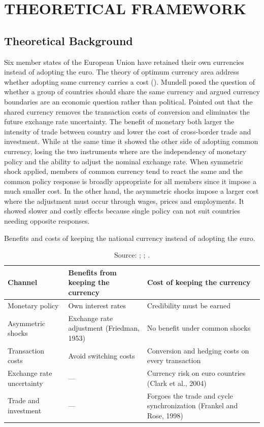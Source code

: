 \section{THEORETICAL FRAMEWORK}\label{sec:theory}

\subsection{Theoretical Background}\label{theo_background}


    Six member states of the European Union have retained their own currencies instead of adopting the euro.
The theory of optimum currency area address whether adopting same currency carries a cost (\cite{mundell_theory_1961}).
Mundell posed the question of whether a group of countries should share the same currency and argued currency boundaries are
an economic question rather than political. 
Pointed out that the shared currency removes the transaction costs of conversion and eliminates the future exchange rate uncertainty.
The benefit of monetary both larger the intensity of trade between country and lower the cost of cross-border trade and investment.
While at the same time it showed the other side of adopting common currency, 
losing the two instruments where are the independency of monetary policy and the ability to adjust the nominal exchange rate.
When symmetric shock applied, members of common currency tend to react the same and the common policy response is broadly appropriate for all members since it impose a much smaller cost.
In the other hand, the asymmetric shocks impose a larger cost where the adjustment must occur through wages, prices and employments. 
It showed slower and costly effects because single policy can not suit countries needing opposite responses.
\begin{table}[htbp]
\centering
\caption{Benefits and costs of keeping the national currency instead of adopting the euro.}
\vspace{\baselineskip}
\label{tab:benefits_threats}
    \begin{tabular}{L{2.6cm} L{5.0cm} L{5.0cm}}
    \toprule
    \textbf{Channel} & \textbf{Benefits from keeping the currency} & \textbf{Cost of keeping the currency} \\
    \midrule
    Monetary policy & Own interest rates & Credibility must be earned \\
    \addlinespace
    Asymmetric shocks & Exchange rate adjustment (Friedman, 1953) & No benefit under common shocks \\
    \addlinespace
    Transaction costs & Avoid switching costs & Conversion and hedging costs on every transaction \\
    \addlinespace
    Exchange rate uncertainty & --- & Currency risk on euro countries (Clark et al., 2004) \\
    \addlinespace
    Trade and investment & --- & Forgoes the trade and cycle synchronization (Frankel and Rose, 1998) \\
    \bottomrule
    \end{tabular}
    \vspace{\baselineskip}
    \caption*{\footnotesize Source: \cite{friedman_methodology_1953}; \cite{frankel_endogeneity_1998}; \cite{clark_new_2004}.}
\end{table}
